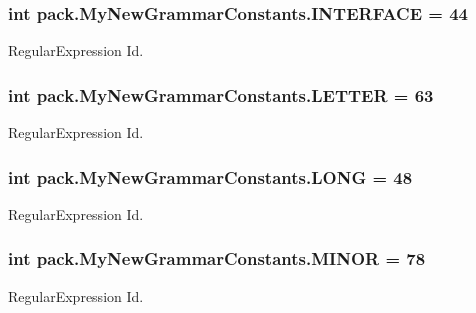 \subsubsection[{\texorpdfstring{I\+N\+T\+E\+R\+F\+A\+CE}{INTERFACE}}]{\setlength{\rightskip}{0pt plus 5cm}int pack.\+My\+New\+Grammar\+Constants.\+I\+N\+T\+E\+R\+F\+A\+CE = 44}\hypertarget{interfacepack_1_1_my_new_grammar_constants_ace35ed65dca60292232dfcf643f28aa5}{}\label{interfacepack_1_1_my_new_grammar_constants_ace35ed65dca60292232dfcf643f28aa5}
Regular\+Expression Id. 
\subsubsection[{\texorpdfstring{L\+E\+T\+T\+ER}{LETTER}}]{\setlength{\rightskip}{0pt plus 5cm}int pack.\+My\+New\+Grammar\+Constants.\+L\+E\+T\+T\+ER = 63}\hypertarget{interfacepack_1_1_my_new_grammar_constants_a9347cc23ca6387ab1f259020521cb10a}{}\label{interfacepack_1_1_my_new_grammar_constants_a9347cc23ca6387ab1f259020521cb10a}
Regular\+Expression Id. 
\subsubsection[{\texorpdfstring{L\+O\+NG}{LONG}}]{\setlength{\rightskip}{0pt plus 5cm}int pack.\+My\+New\+Grammar\+Constants.\+L\+O\+NG = 48}\hypertarget{interfacepack_1_1_my_new_grammar_constants_a6e25841a31e4f3269de8ba3bd53df3ba}{}\label{interfacepack_1_1_my_new_grammar_constants_a6e25841a31e4f3269de8ba3bd53df3ba}
Regular\+Expression Id. 
\subsubsection[{\texorpdfstring{M\+I\+N\+OR}{MINOR}}]{\setlength{\rightskip}{0pt plus 5cm}int pack.\+My\+New\+Grammar\+Constants.\+M\+I\+N\+OR = 78}\hypertarget{interfacepack_1_1_my_new_grammar_constants_ad6b95b337f2b267a3fee49e3063219ad}{}\label{interfacepack_1_1_my_new_grammar_constants_ad6b95b337f2b267a3fee49e3063219ad}
Regular\+Expression Id. 
